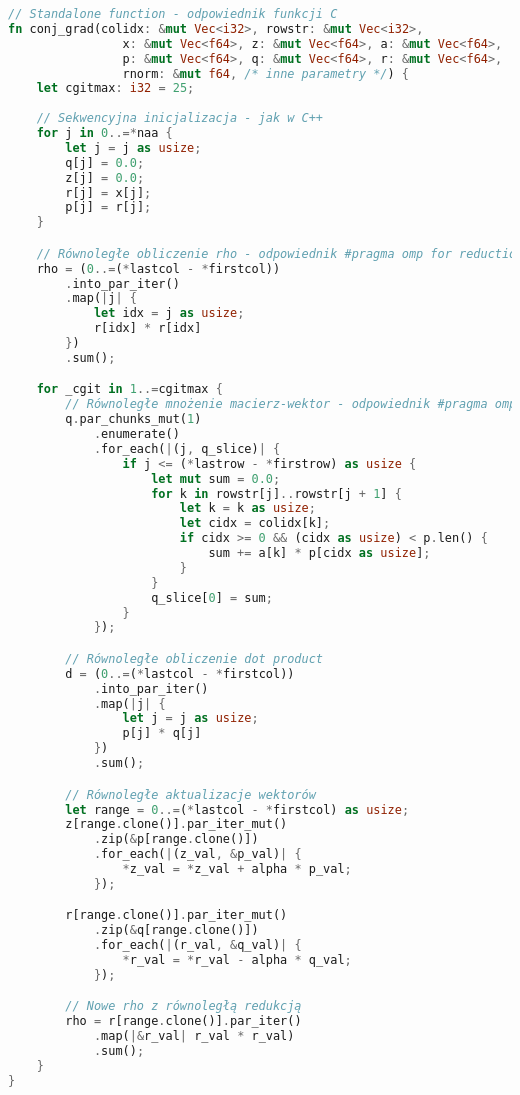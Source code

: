 \begin{lstlisting}[language=Rust, caption={Implementacja benchmarku CG w języku Rust}, label={lst:cg_rust}]
// Standalone function - odpowiednik funkcji C
fn conj_grad(colidx: &mut Vec<i32>, rowstr: &mut Vec<i32>, 
                x: &mut Vec<f64>, z: &mut Vec<f64>, a: &mut Vec<f64>, 
                p: &mut Vec<f64>, q: &mut Vec<f64>, r: &mut Vec<f64>, 
                rnorm: &mut f64, /* inne parametry */) {
    let cgitmax: i32 = 25;
    
    // Sekwencyjna inicjalizacja - jak w C++
    for j in 0..=*naa {
        let j = j as usize;
        q[j] = 0.0;
        z[j] = 0.0;
        r[j] = x[j];
        p[j] = r[j];
    }

    // Równoległe obliczenie rho - odpowiednik #pragma omp for reduction(+:rho)
    rho = (0..=(*lastcol - *firstcol))
        .into_par_iter()
        .map(|j| {
            let idx = j as usize;
            r[idx] * r[idx]
        })
        .sum();

    for _cgit in 1..=cgitmax {
        // Równoległe mnożenie macierz-wektor - odpowiednik #pragma omp for
        q.par_chunks_mut(1)
            .enumerate()
            .for_each(|(j, q_slice)| {
                if j <= (*lastrow - *firstrow) as usize {
                    let mut sum = 0.0;
                    for k in rowstr[j]..rowstr[j + 1] {
                        let k = k as usize;
                        let cidx = colidx[k];
                        if cidx >= 0 && (cidx as usize) < p.len() {
                            sum += a[k] * p[cidx as usize];
                        }
                    }
                    q_slice[0] = sum;
                }
            });

        // Równoległe obliczenie dot product
        d = (0..=(*lastcol - *firstcol))
            .into_par_iter()
            .map(|j| {
                let j = j as usize;
                p[j] * q[j]
            })
            .sum();

        // Równoległe aktualizacje wektorów
        let range = 0..=(*lastcol - *firstcol) as usize;
        z[range.clone()].par_iter_mut()
            .zip(&p[range.clone()])
            .for_each(|(z_val, &p_val)| {
                *z_val = *z_val + alpha * p_val;
            });

        r[range.clone()].par_iter_mut()
            .zip(&q[range.clone()])
            .for_each(|(r_val, &q_val)| {
                *r_val = *r_val - alpha * q_val;
            });

        // Nowe rho z równoległą redukcją
        rho = r[range.clone()].par_iter()
            .map(|&r_val| r_val * r_val)
            .sum();
    }
}
\end{lstlisting}
  
